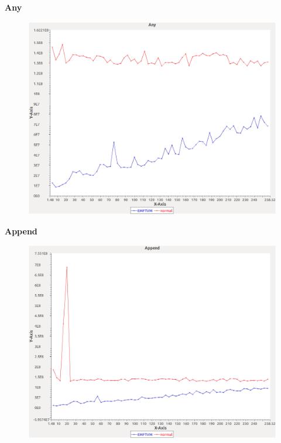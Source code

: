 
\noindent\textbf{Any}

\begin{figure}[h]
\centering	
\includegraphics[width=\textwidth]{../graphs/sequence/Any}
\end{figure}
\pagebreak

\noindent\textbf{Append}

\begin{figure}[h]
\centering
\includegraphics[width=\textwidth]{../graphs/sequence/Append}
\end{figure}
\pagebreak


